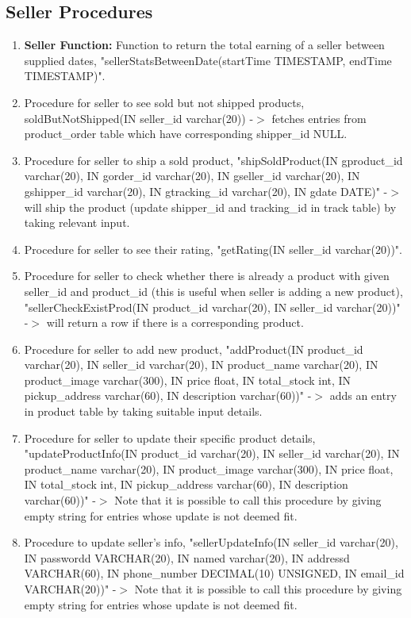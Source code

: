 \documentclass[a4paper,12pt]{article}
\begin{document}
\subsection{Seller Procedures}
\begin{enumerate}
  \item \textbf{Seller Function: }Function to return the total earning of a seller between supplied dates, "sellerStatsBetweenDate(startTime TIMESTAMP, endTime TIMESTAMP)".
  \item Procedure for seller to see sold but not shipped products, soldButNotShipped(IN seller\_id varchar(20)) -$>$ fetches entries from product\_order table which have corresponding shipper\_id NULL.
  \item Procedure for seller to ship a sold product, "shipSoldProduct(IN gproduct\_id varchar(20), IN gorder\_id varchar(20), IN gseller\_id varchar(20), IN gshipper\_id varchar(20), IN gtracking\_id varchar(20), IN gdate DATE)" -$>$ will ship the product (update shipper\_id and tracking\_id in track table) by taking relevant input.
  \item Procedure for seller to see their rating, "getRating(IN seller\_id varchar(20))".
  \item Procedure for seller to check whether there is already a product with given seller\_id and product\_id (this is useful when seller is adding a new product), "sellerCheckExistProd(IN product\_id varchar(20), IN seller\_id varchar(20))" -$>$ will return a row if there is a corresponding product.
  \item Procedure for seller to add new product, "addProduct(IN product\_id varchar(20), IN seller\_id varchar(20), IN product\_name varchar(20), IN product\_image varchar(300), IN price float, IN total\_stock int, IN pickup\_address varchar(60), IN description varchar(60))" -$>$ adds an entry in product table by taking suitable input details.
  \item Procedure for seller to update their specific product details, "updateProductInfo(IN product\_id varchar(20), IN seller\_id varchar(20), IN product\_name varchar(20), IN product\_image varchar(300), IN price float, IN total\_stock int, IN pickup\_address varchar(60), IN description varchar(60))" -$>$ Note that it is possible to call this procedure by giving empty string for entries whose update is not deemed fit.
  \item Procedure to update seller's info, "sellerUpdateInfo(IN seller\_id varchar(20), IN passwordd VARCHAR(20), IN named varchar(20), IN addressd VARCHAR(60), IN phone\_number DECIMAL(10) UNSIGNED, IN email\_id VARCHAR(20))" -$>$ Note that it is possible to call this procedure by giving empty string for entries whose update is not deemed fit.

\end{enumerate}
\end{document}
